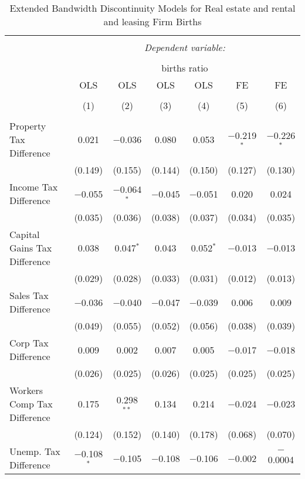 
\begin{table}[!htbp] \centering 
  \caption{Extended Bandwidth Discontinuity Models for  Real estate and rental and leasing Firm Births} 
  \label{53eb} 
\footnotesize 
\begin{tabular}{@{\extracolsep{5pt}}lcccccc} 
\\[-1.8ex]\hline 
\hline \\[-1.8ex] 
 & \multicolumn{6}{c}{\textit{Dependent variable:}} \\ 
\cline{2-7} 
\\[-1.8ex] & \multicolumn{6}{c}{births ratio} \\ 
 & OLS & OLS & OLS & OLS & FE & FE \\ 
\\[-1.8ex] & (1) & (2) & (3) & (4) & (5) & (6)\\ 
\hline \\[-1.8ex] 
 Property Tax Difference & 0.021 & $-$0.036 & 0.080 & 0.053 & $-$0.219$^{*}$ & $-$0.226$^{*}$ \\ 
  & (0.149) & (0.155) & (0.144) & (0.150) & (0.127) & (0.130) \\ 
  Income Tax Difference & $-$0.055 & $-$0.064$^{*}$ & $-$0.045 & $-$0.051 & 0.020 & 0.024 \\ 
  & (0.035) & (0.036) & (0.038) & (0.037) & (0.034) & (0.035) \\ 
  Capital Gains Tax Difference & 0.038 & 0.047$^{*}$ & 0.043 & 0.052$^{*}$ & $-$0.013 & $-$0.013 \\ 
  & (0.029) & (0.028) & (0.033) & (0.031) & (0.012) & (0.013) \\ 
  Sales Tax Difference & $-$0.036 & $-$0.040 & $-$0.047 & $-$0.039 & 0.006 & 0.009 \\ 
  & (0.049) & (0.055) & (0.052) & (0.056) & (0.038) & (0.039) \\ 
  Corp Tax Difference & 0.009 & 0.002 & 0.007 & 0.005 & $-$0.017 & $-$0.018 \\ 
  & (0.026) & (0.025) & (0.026) & (0.025) & (0.025) & (0.025) \\ 
  Workers Comp Tax Difference & 0.175 & 0.298$^{**}$ & 0.134 & 0.214 & $-$0.024 & $-$0.023 \\ 
  & (0.124) & (0.152) & (0.140) & (0.178) & (0.068) & (0.070) \\ 
  Unemp. Tax Difference & $-$0.108$^{*}$ & $-$0.105 & $-$0.108 & $-$0.106 & $-$0.002 & $-$0.0004 \\ 

\end{tabular}
\end{table}
